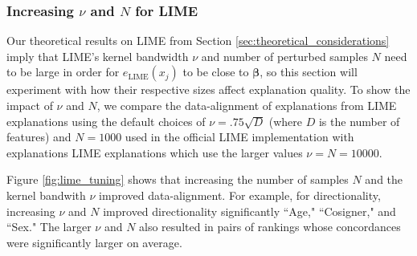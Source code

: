 \documentclass[12pt]{article}  %
\begin{document}
        
        \subsubsection{Increasing $\nu$ and $N$ for LIME } 
            \label{sec:lime_params}
            Our theoretical results on LIME from Section \ref{sec:theoretical_considerations} imply that LIME's kernel bandwidth $\nu$ and number of perturbed samples $N$ need to be large in order for $e_{\text{LIME}}(x_j)$ to be close to $\boldsymbol{\beta}$, so this section will experiment with how their respective sizes affect explanation quality. To show the impact of $\nu$ and $N$, we compare the data-alignment of explanations from LIME explanations using the default choices of $\nu = .75\sqrt{D}$ (where $D$ is the number of features) and $N=1000$ used in the official LIME implementation \citep{ribeiro16lime} with explanations LIME explanations which use the larger values $\nu=N=10000$. 
            
            Figure \ref{fig:lime_tuning} shows that increasing the number of samples $N$ and the kernel bandwith $\nu$ improved data-alignment. For example, for directionality, increasing $\nu$ and $N$ improved directionality  significantly  ``Age," ``Cosigner," and ``Sex." The larger $\nu$ and $N$ also resulted in pairs of rankings whose concordances were significantly larger on average.%
        
\end{document}
